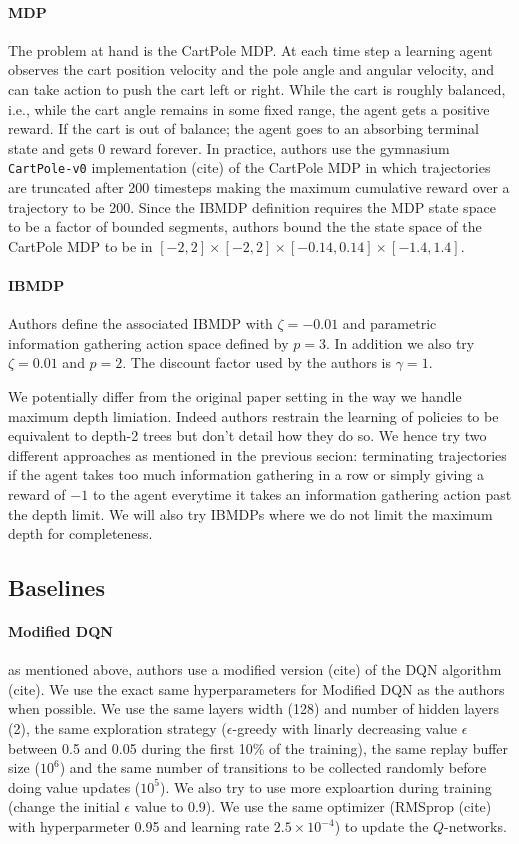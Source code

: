 \paragraph{MDP} The problem at hand is the CartPole MDP. At each time step a learning agent observes the cart position velocity and the pole angle and angular velocity, and can take action to push the cart left or right. While the cart is roughly balanced, i.e., while the cart angle remains in some fixed range, the agent gets a positive reward.
If the cart is out of balance; the agent goes to an absorbing terminal state and gets 0 reward forever.
In practice, authors use the gymnasium \texttt{CartPole-v0} implementation (cite) of the CartPole MDP in which trajectories are truncated after 200 timesteps making the maximum cumulative reward over a trajectory to be 200.
Since the IBMDP definition requires the MDP state space to be a factor of bounded segments, authors bound the the state space of the CartPole MDP to be in $[-2, 2] \times [-2, 2] \times [-0.14, 0.14] \times [-1.4, 1.4]$.

\paragraph{IBMDP} Authors define the associated IBMDP with $\zeta=-0.01$ and parametric information gathering action space defined by $p=3$.
In addition we also try $\zeta=0.01$ and $p=2$.
The discount factor used by the authors is $\gamma=1$.

We potentially differ from the original paper setting in the way we handle maximum depth limiation. 
Indeed authors restrain the learning of policies to be equivalent to depth-2 trees but don't detail how they do so.
We hence try two different approaches as mentioned in the previous secion: terminating trajectories if the agent takes too much information gathering in a row or simply giving a reward of $-1$ to the agent everytime it takes an information gathering action past the depth limit.
We will also try IBMDPs where we do not limit the maximum depth for completeness.

\subsection{Baselines}
\paragraph{Modified DQN} as mentioned above, authors use a modified version (cite) of the DQN algorithm (cite).
We use the exact same hyperparameters for Modified DQN as the authors when possible. 
We use the same layers width (128) and number of hidden layers (2), the same exploration strategy ($\epsilon$-greedy with linarly decreasing value $\epsilon$ between 0.5 and 0.05 during the first 10\% of the training),
the same replay buffer size ($10^6$) and the same number of transitions to be collected randomly before doing value updates ($10^5$).
We also try to use more exploartion during training (change the initial $\epsilon$ value to 0.9).
We use the same optimizer (RMSprop (cite) with hyperparmeter 0.95 and learning rate $2.5 \times 10^{-4}$) to update the $Q$-networks.

